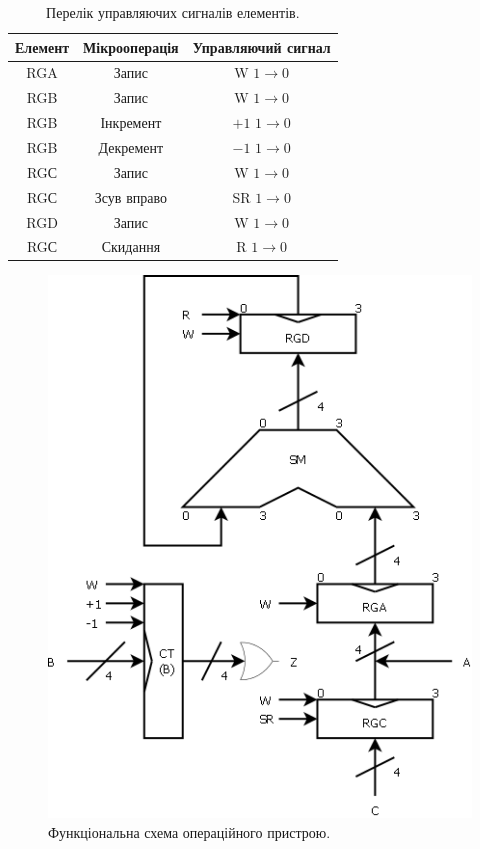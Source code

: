 \documentclass[a4paper, 10pt]{article}
\begin{document}
\begin{table}[h!]
\centering
\begin{tabular}{|c|c|c|}
\hline
Елемент & Мікрооперація & Управляючий сигнал\\
\hline
RGA & Запис & W $1\to0$ \\
\hline
RGB & Запис & W $1\to0$ \\
RGB & Інкремент & $+1$ $1\to0$ \\
RGB & Декремент & $-1$ $1\to0$ \\
\hline
RGС & Запис & W $1\to0$ \\
RGС & Зсув вправо & SR $1\to0$ \\
\hline
RGD & Запис & W $1\to0$ \\
RGС & Скидання & R $1\to0$ \\
\hline
\end{tabular}
\caption{Перелік управляючих сигналів елементів.}
\end{table}

\begin{figure}[H]
\begin{center}
\includegraphics[scale=0.5]{fs.png}
\caption{Функціональна схема операційного пристрою.}
\end{center}
\end{figure}
\end{document}
